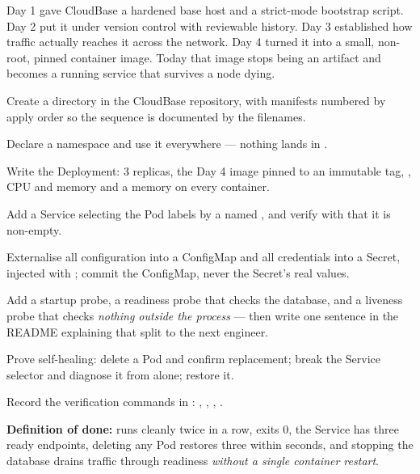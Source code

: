 Day 1 gave CloudBase a hardened base host and a strict-mode bootstrap script. Day 2 put it under version control with reviewable history. Day 3 established how traffic actually reaches it across the network. Day 4 turned it into a small, non-root, pinned container image. Today that image stops being an artifact and becomes a running service that survives a node dying.

\begin{buildalong}
\begin{wbitem}
  \item Create a  directory in the CloudBase repository, with manifests numbered by apply order so the sequence is documented by the filenames.
  \item Declare a  namespace and use it everywhere --- nothing lands in .
  \item Write the Deployment: 3 replicas, the Day 4 image pinned to an immutable tag, , CPU and memory  and a memory  on every container.
  \item Add a  Service selecting the Pod labels by a named , and verify with  that it is non-empty.
  \item Externalise all configuration into a ConfigMap and all credentials into a Secret, injected with ; commit the ConfigMap, never the Secret's real values.
  \item Add a startup probe, a readiness probe that checks the database, and a liveness probe that checks \emph{nothing outside the process} --- then write one sentence in the README explaining that split to the next engineer.
  \item Prove self-healing: delete a Pod and confirm replacement; break the Service selector and diagnose it from  alone; restore it.
  \item Record the verification commands in : , , , .
\end{wbitem}
\smallskip\textbf{Definition of done:}  runs cleanly twice in a row,  exits 0, the Service has three ready endpoints, deleting any Pod restores three within seconds, and stopping the database drains traffic through readiness \emph{without a single container restart}.
\end{buildalong}

